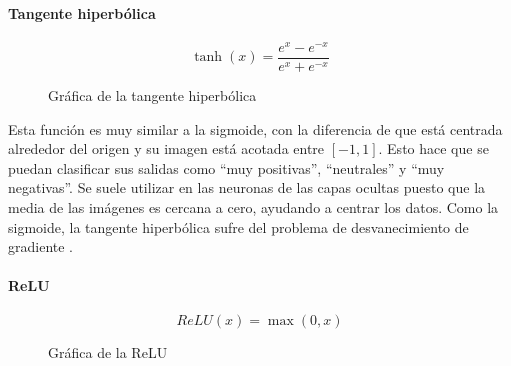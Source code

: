 \documentclass[11pt,twoside,titlepage,a4paper]{article}
\numberwithin{equation}{section} %
\theoremstyle{usual}
\begin{document}
\paragraph{Tangente hiperbólica}
\begin{equation}
    \tanh(x)=\displaystyle\frac{e^x-e^{-x}}{e^x+e^{-x}}
\end{equation}

\begin{figure}[!h]
    \centering
    \caption{Gráfica de la tangente hiperbólica}
\end{figure}

Esta función es muy similar a la sigmoide, con la diferencia de que está
centrada alrededor del origen y su imagen está acotada entre $[-1,1]$.
Esto hace que se puedan clasificar sus salidas como ``muy positivas'',
``neutrales'' y ``muy negativas''. Se suele utilizar en las neuronas de las
capas ocultas puesto que la media de las imágenes es cercana a cero, ayudando a
centrar los datos. Como la sigmoide, la tangente hiperbólica sufre del problema
de desvanecimiento de gradiente \cite{activation}.\\

\paragraph{ReLU}
\begin{equation}
    ReLU(x)=\max(0,x)
\end{equation}

\begin{figure}[!h]
    \centering
    \caption{Gráfica de la ReLU}
\end{figure}
\end{document}
